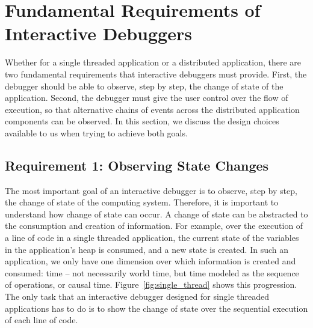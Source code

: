 \section{Fundamental Requirements of Interactive Debuggers}
\label{sec:design}
Whether for a single threaded application or a distributed application, there are two fundamental requirements that interactive debuggers must provide. First, the debugger should be able to observe, step by step, the change of state of the application. Second, the debugger must give the user control over the flow of execution, so that alternative chains of events across the distributed application components can be observed. In this section, we discuss the design choices available to us when trying to achieve both goals. %

\subsection{Requirement 1: Observing State Changes}
\label{subsec:req1}

The most important goal of an interactive debugger is to observe, step by step, the change of state of the computing system. Therefore, it is important to understand how change of state can occur. A change of state can be abstracted to the consumption and creation of information. For example, over the execution of a line of code in a single threaded application, the current state of the variables in the application's heap is consumed, and a new state is created. In such an application, we only have one dimension over which information is created and consumed: time -- not necessarily world time, but time modeled as the sequence of operations, or causal time. Figure~\ref{fig:single_thread} shows this progression. The only task that an interactive debugger designed for single threaded applications has to do is to show the change of state over the sequential execution of each line of code.

